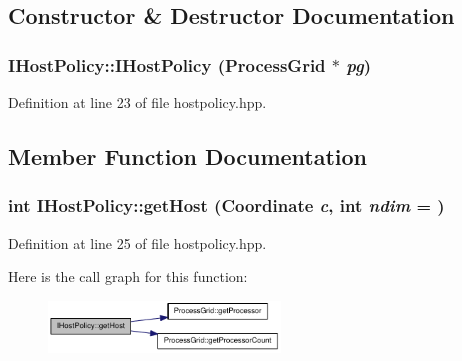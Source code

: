 \subsection{Constructor \& Destructor Documentation}
\hypertarget{class_i_host_policy_a828c447a8f9e985e22d04a0bd933f5d6}{
\subsubsection[{IHostPolicy}]{\setlength{\rightskip}{0pt plus 5cm}IHostPolicy::IHostPolicy ({\bf ProcessGrid} $\ast$ {\em pg})}}
\label{class_i_host_policy_a828c447a8f9e985e22d04a0bd933f5d6}


Definition at line 23 of file hostpolicy.hpp.

\subsection{Member Function Documentation}
\hypertarget{class_i_host_policy_ab759310a417532f33b513fbe1ac6aea8}{
\subsubsection[{getHost}]{\setlength{\rightskip}{0pt plus 5cm}int IHostPolicy::getHost ({\bf Coordinate} {\em c}, \/  int {\em ndim} = {})}}
\label{class_i_host_policy_ab759310a417532f33b513fbe1ac6aea8}


Definition at line 25 of file hostpolicy.hpp.

Here is the call graph for this function:\nopagebreak
\begin{figure}[H]
\begin{center}
\leavevmode
\includegraphics[width=175pt]{class_i_host_policy_ab759310a417532f33b513fbe1ac6aea8_cgraph}
\end{center}
\end{figure}



